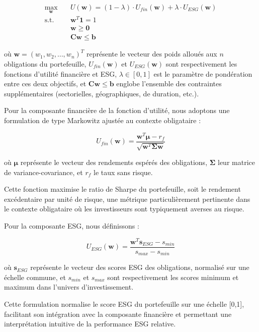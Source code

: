 \begin{align}
\max_{\mathbf{w}} \quad & U(\mathbf{w}) = (1-\lambda) \cdot U_{fin}(\mathbf{w}) + \lambda \cdot U_{ESG}(\mathbf{w}) \\
\text{s.t.} \quad & \mathbf{w}^T \mathbf{1} = 1 \\
& \mathbf{w} \geq \mathbf{0} \\
& \mathbf{C w} \leq \mathbf{b}
\end{align}

où $\mathbf{w} = (w_1, w_2, \ldots, w_n)^T$ représente le vecteur des poids alloués aux $n$ obligations du portefeuille, $U_{fin}(\mathbf{w})$ et $U_{ESG}(\mathbf{w})$ sont respectivement les fonctions d'utilité financière et ESG, $\lambda \in [0,1]$ est le paramètre de pondération entre ces deux objectifs, et $\mathbf{C w} \leq \mathbf{b}$ englobe l'ensemble des contraintes supplémentaires (sectorielles, géographiques, de duration, etc.).

Pour la composante financière de la fonction d'utilité, nous adoptons une formulation de type Markowitz ajustée au contexte obligataire :

\begin{equation}
U_{fin}(\mathbf{w}) = \frac{\mathbf{w}^T \boldsymbol{\mu} - r_f}{\sqrt{\mathbf{w}^T \boldsymbol{\Sigma} \mathbf{w}}}
\end{equation}

où $\boldsymbol{\mu}$ représente le vecteur des rendements espérés des obligations, $\boldsymbol{\Sigma}$ leur matrice de variance-covariance, et $r_f$ le taux sans risque.

Cette fonction maximise le ratio de Sharpe du portefeuille, soit le rendement excédentaire par unité de risque, une métrique particulièrement pertinente dans le contexte obligataire où les investisseurs sont typiquement averses au risque.

Pour la composante ESG, nous définissons :

\begin{equation}
U_{ESG}(\mathbf{w}) = \frac{\mathbf{w}^T \mathbf{s}_{ESG} - s_{min}}{s_{max} - s_{min}}
\end{equation}

où $\mathbf{s}_{ESG}$ représente le vecteur des scores ESG des obligations, normalisé sur une échelle commune, et $s_{min}$ et $s_{max}$ sont respectivement les scores minimum et maximum dans l'univers d'investissement.

Cette formulation normalise le score ESG du portefeuille sur une échelle [0,1], facilitant son intégration avec la composante financière et permettant une interprétation intuitive de la performance ESG relative.

